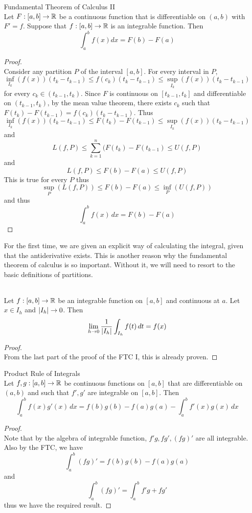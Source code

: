 \documentclass[a4paper]{article}
\begin{document}
\begin{thm}{Fundamental Theorem of Calculus II}{}\\ Let $F:[a,b]\to\mathbb{R}$ be a continuous function that is differentiable on $(a,b)$ with $F'=f$. Suppose that $f:[a,b]\to\mathbb{R}$ is an integrable function. Then $$\int_{a}^{b}f(x)dx=F(b)-F(a)$$ 
\begin{proof}\\
Consider any partition $P$ of the interval $[a,b]$. For every interval in $P$, $$\inf_{I_k}(f(x))(t_k-t_{k-1})\leq f(c_k)(t_k-t_{k-1})\leq\sup_{I_k}(f(x))(t_k-t_{k-1})$$
for every $c_k\in(t_{k-1},t_k)$. Since $F$ is continuous on $[t_{k-1},t_k]$ and differentiable on $(t_{k-1},t_k)$, by the mean value theorem, there exists $c_k$ such that $F(t_k)-F(t_{k-1})=f(c_k)(t_k-t_{k-1})$. Thus $$\inf_{I_k}(f(x))(t_k-t_{k-1})\leq F(t_k)-F(t_{k-1})\leq\sup_{I_k}(f(x))(t_k-t_{k-1})$$ and $$L(f,P)\leq\sum_{k=1}^n(F(t_k)-F(t_{k-1})\leq U(f,P)$$ and $$L(f,P)\leq F(b)-F(a)\leq U(f,P)$$ This is true for every $P$ thus $$\sup_{P}(L(f,P))\leq F(b)-F(a)\leq\inf_{P}(U(f,P))$$ and thus $$\int_a^bf(x)\,dx=F(b)-F(a)$$
\end{proof}
\end{thm}

For the first time, we are given an explicit way of calculating the integral, given that the antiderivative exists. This is another reason why the fundamental theorem of calculus is so important. Without it, we will need to resort to the basic definitions of partitions. 

\begin{thm}{}{}\\ Let $f:[a,b]\to\mathbb{R}$ be an integrable function on $[a,b]$ and continuous at $a$. Let $x\in I_h$ and $\abs{I_h}\to 0$. Then $$\lim_{h\to 0}\frac{1}{\abs{I_h}}\int_{I_h}f(t)\,dt=f(x)$$ 
\begin{proof}\\ From the last part of the proof of the FTC I, this is already proven. 
\end{proof}
\end{thm}

\begin{thm}{Product Rule of Integrals}{}\\ Let $f,g:[a,b]\to\mathbb{R}$ be continuous functions on $[a,b]$ that are differentiable on $(a,b)$ and such that $f',g'$ are integrable on $[a,b]$. Then $$\int_{a}^{b}f(x)g'(x)\,dx=f(b)g(b)-f(a)g(a)-\int_{a}^{b}f'(x)g(x)\,dx$$ 
\begin{proof}\\ Note that by the algebra of integrable function, $f'g,fg',(fg)'$ are all integrable. Also by the FTC, we have $$\int_a^b(fg)'=f(b)g(b)-f(a)g(a)$$ and $$\int_a^b(fg)'=\int_a^bf'g+fg'$$ thus we have the required result. 
\end{proof}
\end{thm}
\end{document}
